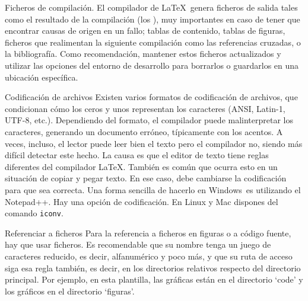 \begin{descript}

	\item[Ficheros de compilación.] El compilador de \LaTeX\ genera ficheros de salida tales como el resultado de la compilación (los ), muy importantes en caso de tener que encontrar causas de origen en un fallo; tablas de contenido, tablas de figuras, ficheros que realimentan la siguiente compilación como las referencias cruzadas, o la bibliografía. Como recomendación, mantener estos ficheros actualizados y utilizar las opciones del entorno de desarrollo para borrarlos o guardarlos en una ubicación específica.

	\item[Codificación de archivos] Existen varios formatos de codificación de archivos, que condicionan cómo los ceros y unos representan los caracteres (ANSI, Latin-1, UTF-8, etc.). Dependiendo del formato, el compilador puede malinterpretar los caracteres, generando un documento erróneo, típicamente con los acentos. A veces, incluso, el lector puede leer bien el texto pero el compilador no, siendo más difícil detectar este hecho. La causa es que el editor de texto tiene reglas diferentes del compilador \LaTeX. También es común que ocurra esto en un situación de copiar y pegar texto. En ese caso, debe cambiarse la codificación para que sea correcta. Una forma sencilla de hacerlo en Windows\R\ es utilizando el Notepad++. Hay una opción de codificación. En Linux y Mac dispones del comando \texttt{iconv}.

	\item[Referenciar a ficheros] Para la referencia a ficheros en figuras o a código fuente, hay que usar ficheros. Es recomendable que su nombre tenga un juego de caracteres reducido, es decir, alfanumérico y poco más, y que su ruta de acceso siga esa regla también, es decir, en los directorios relativos respecto del directorio principal. Por ejemplo, en esta plantilla, las gráficas están en el directorio `code' y los gráficos en el directorio `figuras'.

\end{descript}

\chapterend{}
